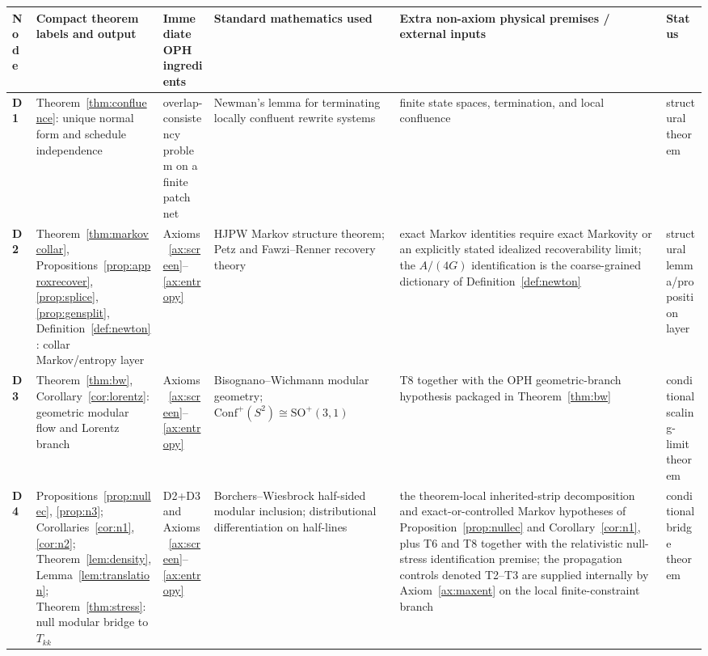 \documentclass[11pt]{article}
\newcommand{\Conf}{\mathrm{Conf}}
\begin{document}
\begingroup
\scriptsize
\setlength{\tabcolsep}{2pt}
\begin{longtable}{@{}>{\raggedright\arraybackslash}p{}>{\raggedright\arraybackslash}p{}>{\raggedright\arraybackslash}p{}>{\raggedright\arraybackslash}p{}>{\raggedright\arraybackslash}p{}>{\raggedright\arraybackslash}p{}@{}}
\toprule
Node & Compact theorem labels and output & Immediate OPH ingredients & Standard mathematics used & Extra non-axiom physical premises / external inputs & Status \\
\midrule
\endhead
\bottomrule
\endfoot
\textbf{D1} & Theorem~\ref{thm:confluence}: unique normal form and schedule independence & overlap-consistency problem on a finite patch net & Newman's lemma for terminating locally confluent rewrite systems & finite state spaces, termination, and local confluence & structural theorem \\
\textbf{D2} & Theorem~\ref{thm:markovcollar}, Propositions~\ref{prop:approxrecover}, \ref{prop:splice}, \ref{prop:gensplit}, Definition~\ref{def:newton}: collar Markov/entropy layer & Axioms~\ref{ax:screen}--\ref{ax:entropy} & HJPW Markov structure theorem; Petz and Fawzi--Renner recovery theory & exact Markov identities require exact Markovity or an explicitly stated idealized recoverability limit; the \(A/(4G)\) identification is the coarse-grained dictionary of Definition~\ref{def:newton} & structural lemma/proposition layer \\
\textbf{D3} & Theorem~\ref{thm:bw}, Corollary~\ref{cor:lorentz}: geometric modular flow and Lorentz branch & Axioms~\ref{ax:screen}--\ref{ax:entropy} & Bisognano--Wichmann modular geometry; \(\Conf^+(S^2)\cong \mathrm{SO}^+(3,1)\) & T8 together with the OPH geometric-branch hypothesis packaged in Theorem~\ref{thm:bw} & conditional scaling-limit theorem \\
\textbf{D4} & Propositions~\ref{prop:nullec}, \ref{prop:n3}; Corollaries~\ref{cor:n1}, \ref{cor:n2}; Theorem~\ref{lem:density}, Lemma~\ref{lem:translation}; Theorem~\ref{thm:stress}: null modular bridge to \(T_{kk}\) & D2+D3 and Axioms~\ref{ax:screen}--\ref{ax:entropy} & Borchers--Wiesbrock half-sided modular inclusion; distributional differentiation on half-lines & the theorem-local inherited-strip decomposition and exact-or-controlled Markov hypotheses of Proposition~\ref{prop:nullec} and Corollary~\ref{cor:n1}, plus T6 and T8 together with the relativistic null-stress identification premise; the propagation controls denoted T2--T3 are supplied internally by Axiom~\ref{ax:maxent} on the local finite-constraint branch & conditional bridge theorem \\

\end{longtable}
\end{document}
